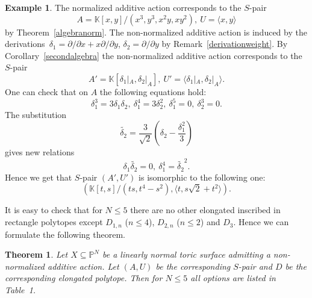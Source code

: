 \documentclass[a4paper,draft,reqno,12pt]{amsart}
\newtheorem{theorem}{Theorem}
\theoremstyle{definition}
\theoremstyle{definition}
\newtheorem{example}{Example}
\theoremstyle{remark}
\def\BK{{\mathbb K}}
\def\BK{{\mathbb K}}
\def\BP{{\mathbb P}}
\begin{document}
\begin{example}
    The normalized additive action corresponds to the $S$-pair\begin{equation*}
        A = \BK[x,y]/(x^3,y^3,x^2y,xy^2), \ U = \langle x, y \rangle
    \end{equation*}by Theorem~\ref{algebranorm}. The non-normalized additive action is induced by the derivations~$\delta_1=\partial/\partial x+x\partial/\partial y$, $\delta_2 = \partial/\partial y$ by Remark~\ref{derivationweight}. By Corollary~\ref{secondalgebra} the non-normalized additive action corresponds to the $S$-pair\begin{equation*}
        A' = \BK[\delta_1|_A,\delta_2|_A], \ U' = \langle\delta_1|_A,\delta_2|_A\rangle.
    \end{equation*} One can check that on $A$ the following equations hold: \begin{equation*}
        \delta_1^3=3\delta_1\delta_2, \ \delta_1^4=3\delta_2^2, \ \delta_1^5 = 0, \ \delta_2^3 = 0.
    \end{equation*} The substitution\begin{equation*}
        \widetilde{\delta_2} = \frac{3}{\sqrt{2}}(\delta_2-\frac{\delta_1^2}{3})
    \end{equation*} gives new relations\begin{equation*}
        \delta_1\widetilde{\delta_2}=0,  \ \delta_1^4 = \widetilde{\delta_2}^2.
    \end{equation*} Hence we get that $S$-pair $(A',U')$ is isomorphic to the following one:\begin{equation}
        (\BK[t,s]/(ts,t^4-s^2), \langle t, s\sqrt2+t^2\rangle).
    \end{equation}

\end{example}

It is easy to check that for $N\leq5$ there are no other elongated inscribed in rectangle polytopes except $D_{1,n}$ ($n\leq4$), $D_{2,n}$ ($n\leq2$) and $D_3$. Hence we can formulate the following theorem.

\begin{theorem}
    Let $X\subseteq\BP^N$ be a linearly normal toric surface admitting a non-normalized additive action. Let $(A,U)$ be the corresponding $S$-pair and $D$ be the corresponding elongated polytope. Then for $N\leq5$ all options are listed in Table~1.
\end{theorem}
\end{document}
